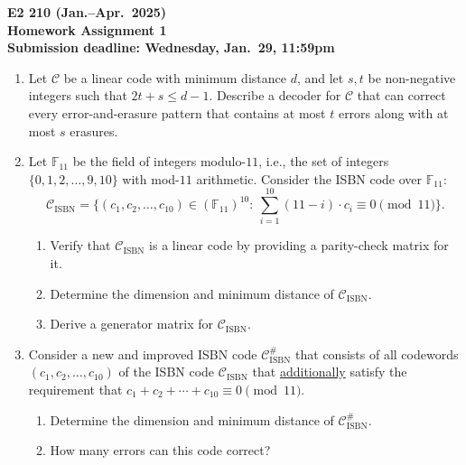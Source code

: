 \documentclass[11pt,a4paper]{article}
\def\F{{\mathbb F}}
\def\cC{\mathcal{C}}
\begin{document}
\begin{center}
{\Large \bf E2 210 (Jan.--Apr.\ 2025)} \\[6pt]

{\large\bf Homework Assignment 1} \\[6pt]

{\bf Submission deadline: Wednesday, Jan.\ 29, 11:59pm}
\end{center}

\vspace{2ex}

\noindent
\begin{enumerate}
\item Let $\cC$ be a linear code with minimum distance $d$, and let
$s,t$ be non-negative integers such that $2t + s \le d-1$.
Describe a decoder for $\cC$ that can correct every error-and-erasure
pattern that contains at most $t$ errors along with at most $s$ erasures.

\item Let $\F_{11}$ be the field of integers modulo-$11$, i.e., the set of integers $\{0,1,2,\ldots,9,10\}$ with mod-$11$ arithmetic.
Consider the ISBN code over $\F_{11}$:
$$
\cC_\text{ISBN} = \biggl\{(c_1,c_2,\ldots,c_{10}) \in {(\F_{11})}^{10}:\
 \sum_{i=1}^{10} (11-i) \cdot c_i \equiv 0 \pmod{11}\biggr\}.
$$
\begin{enumerate}
\item Verify that $\cC_\text{ISBN}$ is a linear code by providing a parity-check matrix for it.
\item Determine the dimension and minimum distance of $\cC_\text{ISBN}$.
\item Derive a generator matrix for $\cC_\text{ISBN}$.
\end{enumerate}

\item Consider a new and improved ISBN code $\cC_\text{ISBN}^{\#}$ that consists of all codewords $(c_1,c_2,\ldots,c_{10})$ of the ISBN code $\cC_\text{ISBN}$ that \underline{additionally} satisfy the requirement that $c_1+c_2+\cdots+c_{10} \equiv 0 \pmod{11}$.  
\begin{enumerate}
\item Determine the dimension and minimum distance of $\cC_\text{ISBN}^{\#}$.
\item How many errors can this code correct?
\end{enumerate}


\end{enumerate}
\end{document}
